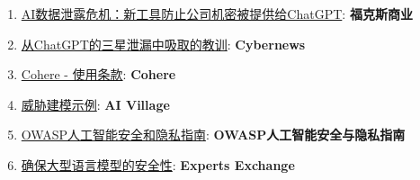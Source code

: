\documentclass[
]{article}
\providecommand{\tightlist}{%
  \setlength{\itemsep}{0pt}\setlength{\parskip}{0pt}}
\begin{document}
\begin{enumerate}
\def\labelenumi{\arabic{enumi}.}
\tightlist
\item
  \href{https://www.foxbusiness.com/politics/ai-data-leak-crisis-prevent-company-secrets-chatgpt}{AI数据泄露危机：新工具防止公司机密被提供给ChatGPT}:
  \textbf{福克斯商业}
\item
  \href{https://cybernews.com/security/chatgpt-samsung-leak-explained-lessons/}{从ChatGPT的三星泄漏中吸取的教训}:
  \textbf{Cybernews}
\item
  \href{https://cohere.com/terms-of-use}{Cohere - 使用条款}:
  \textbf{Cohere}
\item
  \href{https://aivillage.org/large\%20language\%20models/threat-modeling-llm/}{威胁建模示例}:
  \textbf{AI Village}
\item
  \href{https://owasp.org/www-project-ai-security-and-privacy-guide/}{OWASP人工智能安全和隐私指南}:
  \textbf{OWASP人工智能安全与隐私指南}
\item
  \href{https://www.experts-exchange.com/articles/38220/Ensuring-the-Security-of-Large-Language-Models-Strategies-and-Best-Practices.html}{确保大型语言模型的安全性}:
  \textbf{Experts Exchange}
\end{enumerate}
\end{document}
